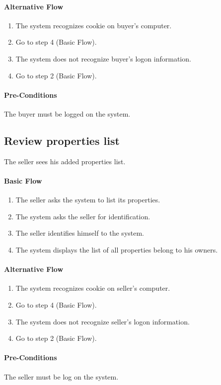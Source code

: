 \documentclass[a4paper,12pt]{article}
\begin{document}
\paragraph{Alternative Flow}
\begin{enumerate}
\item The system recognizes cookie on buyer's computer. 
\item Go to step 4 (Basic Flow).
\item The system does not recognize buyer's logon information.
\item Go to step 2 (Basic Flow).
\end{enumerate}
\paragraph{Pre-Conditions}
The buyer must be logged on the system.

\subsection{Review properties list}
The seller sees his added properties list.
\paragraph{Basic Flow}
\begin{enumerate}
\item The seller asks the system to list its properties.
\item The system asks the seller for identification.
\item The seller identifies himself to the system.
\item The system displays the list of all properties belong to his owners.
\end{enumerate}
\paragraph{Alternative Flow}
\begin{enumerate}
\item The system recognizes cookie on seller's computer. 
\item Go to step 4 (Basic Flow).
\item The system does not recognize seller's logon information.
\item Go to step 2 (Basic Flow).
\end{enumerate}
\paragraph{Pre-Conditions}
The seller must be log on the system.
\end{document}
